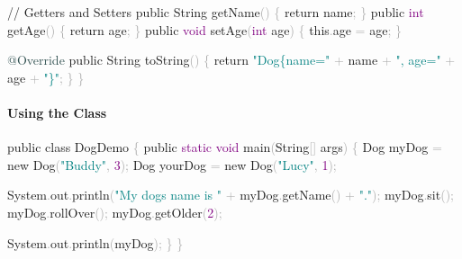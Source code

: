 \documentclass[
  justified,
  openright,
]{tufte-book}
\let\subsubsection\paragraph
\let\paragraph\paragraph
\newcommand{\AttributeTok}[1]{\textcolor{DarkSlateGray}{#1}}
\newcommand{\BuiltInTok}[1]{#1}
\newcommand{\CommentTok}[1]{\textcolor{MidGray}{#1}}
\newcommand{\ControlFlowTok}[1]{\textcolor{BrandBlue}{#1}}
\newcommand{\DataTypeTok}[1]{\textcolor{Purple}{#1}}
\newcommand{\DecValTok}[1]{\textcolor{Purple}{#1}}
\newcommand{\FunctionTok}[1]{\textcolor{BrandBlue}{#1}}
\newcommand{\KeywordTok}[1]{\textcolor{BrandBlue}{#1}}
\newcommand{\NormalTok}[1]{#1}
\newcommand{\OperatorTok}[1]{\textcolor{DarkGray}{#1}}
\newcommand{\StringTok}[1]{\textcolor{Teal}{#1}}
\newenvironment{Shaded}{%
  \begin{snugshade}
}{%
  \end{snugshade}
}
\let\subsubsection\paragraph
\let\paragraph\paragraph
\begin{document}
\begin{Shaded}
\begin{Highlighting}[]
    \CommentTok{// Getters and Setters}
    \KeywordTok{public} \BuiltInTok{String} \FunctionTok{getName}\OperatorTok{()} \OperatorTok{\{} \ControlFlowTok{return}\NormalTok{ name}\OperatorTok{;} \OperatorTok{\}}
    \KeywordTok{public} \DataTypeTok{int} \FunctionTok{getAge}\OperatorTok{()} \OperatorTok{\{} \ControlFlowTok{return}\NormalTok{ age}\OperatorTok{;} \OperatorTok{\}}
    \KeywordTok{public} \DataTypeTok{void} \FunctionTok{setAge}\OperatorTok{(}\DataTypeTok{int}\NormalTok{ age}\OperatorTok{)} \OperatorTok{\{} \KeywordTok{this}\OperatorTok{.}\FunctionTok{age} \OperatorTok{=}\NormalTok{ age}\OperatorTok{;} \OperatorTok{\}}

    \AttributeTok{@Override}
    \KeywordTok{public} \BuiltInTok{String} \FunctionTok{toString}\OperatorTok{()} \OperatorTok{\{}
        \ControlFlowTok{return} \StringTok{"Dog\{name=\textquotesingle{}"} \OperatorTok{+}\NormalTok{ name }\OperatorTok{+} \StringTok{"\textquotesingle{}, age="} \OperatorTok{+}\NormalTok{ age }\OperatorTok{+} \StringTok{"\}"}\OperatorTok{;}
    \OperatorTok{\}}
\OperatorTok{\}}
\end{Highlighting}
\end{Shaded}

\subsubsection{Using the Class}\label{using-the-class}

\begin{Shaded}
\begin{Highlighting}[]
\KeywordTok{public} \KeywordTok{class}\NormalTok{ DogDemo }\OperatorTok{\{}
    \KeywordTok{public} \DataTypeTok{static} \DataTypeTok{void} \FunctionTok{main}\OperatorTok{(}\BuiltInTok{String}\OperatorTok{[]}\NormalTok{ args}\OperatorTok{)} \OperatorTok{\{}
\NormalTok{        Dog myDog }\OperatorTok{=} \KeywordTok{new} \FunctionTok{Dog}\OperatorTok{(}\StringTok{"Buddy"}\OperatorTok{,} \DecValTok{3}\OperatorTok{);}
\NormalTok{        Dog yourDog }\OperatorTok{=} \KeywordTok{new} \FunctionTok{Dog}\OperatorTok{(}\StringTok{"Lucy"}\OperatorTok{,} \DecValTok{1}\OperatorTok{);}

        \BuiltInTok{System}\OperatorTok{.}\FunctionTok{out}\OperatorTok{.}\FunctionTok{println}\OperatorTok{(}\StringTok{"My dog\textquotesingle{}s name is "} \OperatorTok{+}\NormalTok{ myDog}\OperatorTok{.}\FunctionTok{getName}\OperatorTok{()} \OperatorTok{+} \StringTok{"."}\OperatorTok{);}
\NormalTok{        myDog}\OperatorTok{.}\FunctionTok{sit}\OperatorTok{();}
\NormalTok{        myDog}\OperatorTok{.}\FunctionTok{rollOver}\OperatorTok{();}
\NormalTok{        myDog}\OperatorTok{.}\FunctionTok{getOlder}\OperatorTok{(}\DecValTok{2}\OperatorTok{);}

        \BuiltInTok{System}\OperatorTok{.}\FunctionTok{out}\OperatorTok{.}\FunctionTok{println}\OperatorTok{(}\NormalTok{myDog}\OperatorTok{);}
    \OperatorTok{\}}
\OperatorTok{\}}
\end{Highlighting}
\end{Shaded}
\end{document}
